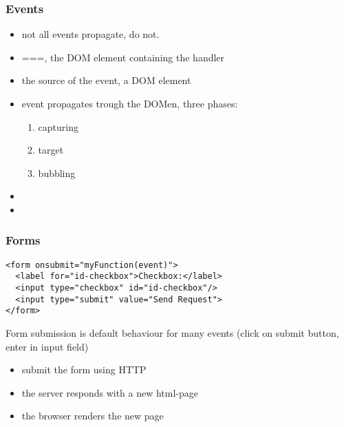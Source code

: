 \begin{frame}[fragile]
\frametitle{Events}
\color{structure}

\begin{itemize}\color{structure}
\item not all events propagate,  do not.
\item {}===, the DOM element containing the handler
\item {} the source of the event, a DOM element
\item event propagates trough the DOMen, three phases:
  \begin{enumerate}
    \item capturing
    \item target
    \item bubbling
  \end{enumerate}
\item {}
\item {}
\end{itemize}

\end{frame}

\begin{frame}[fragile]
\frametitle{Forms}
\color{structure}

\begin{lstlisting}[style=htmlcssjs]
<form onsubmit="myFunction(event)">
  <label for="id-checkbox">Checkbox:</label>
  <input type="checkbox" id="id-checkbox"/>
  <input type="submit" value="Send Request">
</form>
\end{lstlisting}

Form submission is default behaviour for many events (click on submit button, enter in input field)
\begin{itemize}
  \item submit the form using HTTP
  \item the server responds with a new html-page
  \item the browser renders the new page
\end{itemize}

\end{frame}
